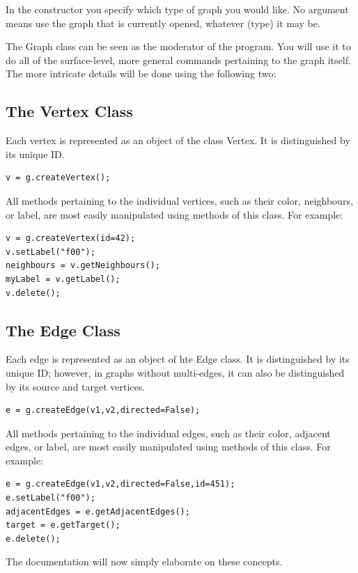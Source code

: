 \documentclass{article}
\newlength\q
\begin{document}
In the constructor you specify which type of graph you would like. No argument means use the graph that is currently opened, whatever (type) it may be.

The Graph class can be seen as the moderator of the program. You will use it to do all of the surface-level, more general commands pertaining to the graph itself. The more intricate details will be done using the following two:

\subsection{The Vertex Class}
Each vertex is represented as an object of the class Vertex. It is distinguished by its unique ID. 

\begin{lstlisting}
v = g.createVertex();
\end{lstlisting}

All methods pertaining to the individual vertices, such as their color, neighbours, or label, are most easily manipulated using methods of this class. For example:

\begin{lstlisting}
v = g.createVertex(id=42);
v.setLabel("f00");
neighbours = v.getNeighbours();
myLabel = v.getLabel();
v.delete();
\end{lstlisting}

\subsection{The Edge Class}
Each edge is represented as an object of hte Edge class. It is distinguished by its unique ID; however, in graphs without multi-edges, it can also be distinguished by its source and target vertices.

\begin{lstlisting}
e = g.createEdge(v1,v2,directed=False);
\end{lstlisting}

All methods pertaining to the individual edges, such as their color, adjacent edges, or label, are most easily manipulated using methods of this class. For example:

\begin{lstlisting}
e = g.createEdge(v1,v2,directed=False,id=451);
e.setLabel("f00");
adjacentEdges = e.getAdjacentEdges();
target = e.getTarget();
e.delete();
\end{lstlisting}

The documentation will now simply elaborate on these concepts.
\end{document}
